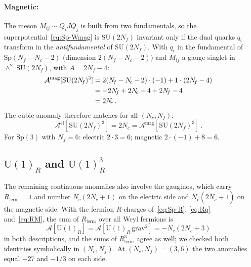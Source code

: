 \documentclass[11pt,a4paper]{article}
\theoremstyle{plain}
\theoremstyle{definition}
\theoremstyle{remark}
\newcommand{\Nc}{N_{\!c}}
\newcommand{\Nf}{N_{\!f}}
\newcommand{\SU}[1]{\mathrm{SU}(#1)}
\newcommand{\UU}[1]{\mathrm{U}(#1)}
\newcommand{\Sp}[1]{\mathrm{Sp}(#1)}
\newcommand{\antisym}{\wedge^{\!2}}
\begin{document}
\paragraph{Magnetic:}
The meson $M_{ij} \sim Q_i J Q_j$ is built from two fundamentals, so
the superpotential~\eqref{eq:Sp-Wmag} is $\SU{2\Nf}$ invariant only if
the dual quarks $q_i$ transform in the \emph{antifundamental} of
$\SU{2\Nf}$.  With $q_i$ in the fundamental of $\Sp{\Nf - \Nc - 2}$
(dimension $2(\Nf - \Nc - 2)$) and $M_{ij}$ a gauge singlet in
$\antisym\;\SU{2\Nf}$, with $A = 2\Nf - 4$:
\begin{align}
  \mathcal{A}^{\mathrm{mag}}[\SU{2\Nf}^3]
  &= 2(\Nf - \Nc - 2) \cdot (-1) + 1 \cdot (2\Nf - 4) \notag \\
  &= -2\Nf + 2\Nc + 4 + 2\Nf - 4 \notag \\
  &= 2\Nc\,.
  \label{eq:cubic-mag}
\end{align}
The cubic anomaly therefore matches for all $(\Nc, \Nf)$:
\begin{equation}\label{eq:cubic-match}
  \boxed{
  \mathcal{A}^{\mathrm{el}}[\SU{2\Nf}^3]
  = 2\Nc
  = \mathcal{A}^{\mathrm{mag}}[\SU{2\Nf}^3]
  }\,.
\end{equation}
For $\Sp{3}$ with $\Nf = 6$: electric $2 \cdot 3 = 6$; magnetic
$2 \cdot (-1) + 8 = 6$.  \checkmark

\subsection{$\UU{1}_R$ and $\UU{1}_R^3$}

The remaining continuous anomalies also involve the gauginos, which
carry $R_{\mathrm{ferm}} = 1$ and number $\Nc(2\Nc + 1)$ on the electric
side and $\widetilde{\Nc}(2\widetilde{\Nc} + 1)$ on the magnetic side.
With the fermion $R$-charges of~\eqref{eq:Sp-R}, \eqref{eq:Rq}
and~\eqref{eq:RM}, the sum of $R_{\mathrm{ferm}}$ over all Weyl fermions
is
\begin{equation}\label{eq:R-lin}
  \mathcal{A}[\UU{1}_R] = \mathcal{A}[\UU{1}_R\,\mathrm{grav}^2]
  = -\Nc(2\Nc + 3)
\end{equation}
in both descriptions, and the sums of $R_{\mathrm{ferm}}^3$ agree as
well; we checked both identities symbolically in $(\Nc, \Nf)$.  At
$(\Nc, \Nf) = (3, 6)$ the two anomalies equal $-27$ and $-1/3$ on each
side.


\end{document}
